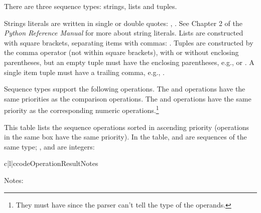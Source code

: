 There are three sequence types: strings, lists and tuples.

Strings literals are written in single or double quotes:
, .  See Chapter 2 of the \emph{Python
Reference Manual} for more about string literals.  Lists are
constructed with square brackets, separating items with commas:
\code{[a, b, c]}.  Tuples are constructed by the comma operator (not
within square brackets), with or without enclosing parentheses, but an
empty tuple must have the enclosing parentheses, e.g.,
 or \code{()}.  A single item tuple must have a trailing
comma, e.g., .

Sequence types support the following operations.  The  and
 operations have the same priorities as the comparison
operations.  The \samp{+} and \samp{*} operations have the same
priority as the corresponding numeric operations.\footnote{They must
have since the parser can't tell the type of the operands.}

This table lists the sequence operations sorted in ascending priority
(operations in the same box have the same priority).  In the table,
 and  are sequences of the same type; , 
and  are integers:

\begin{tableiii}{c|l|c}{code}{Operation}{Result}{Notes}
  \hline
  \hline
  \hline
\end{tableiii}

\noindent
Notes:

